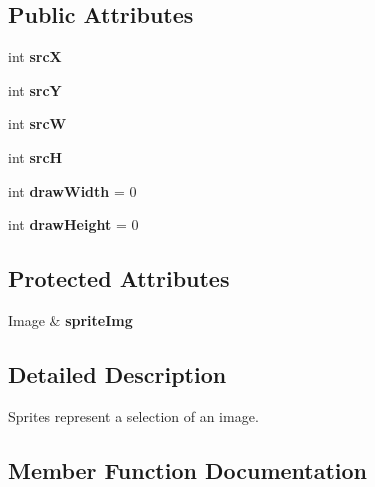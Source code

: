 \subsection*{Public Attributes}
\begin{DoxyCompactItemize}
\item 
\mbox{\label{classcturtle_1_1Sprite_a14ee0caf7711b2bf11095ddaac069c74}} 
int {\bfseries srcX}
\item 
\mbox{\label{classcturtle_1_1Sprite_adc6670708305b93417b816d5461ff8f6}} 
int {\bfseries srcY}
\item 
\mbox{\label{classcturtle_1_1Sprite_a07c26c8940ff747d59932da16046b8df}} 
int {\bfseries srcW}
\item 
\mbox{\label{classcturtle_1_1Sprite_ac971ad3971d5a17c480e211c4393e85d}} 
int {\bfseries srcH}
\item 
\mbox{\label{classcturtle_1_1Sprite_ae913b2e7e5a63b5aa435b34d21178ef8}} 
int {\bfseries draw\+Width} = 0
\item 
\mbox{\label{classcturtle_1_1Sprite_a5138e4802c2d4cc73f43100de2cba412}} 
int {\bfseries draw\+Height} = 0
\end{DoxyCompactItemize}
\subsection*{Protected Attributes}
\begin{DoxyCompactItemize}
\item 
\mbox{\label{classcturtle_1_1Sprite_a7aff22fa5844b2cb6c6cf95467df2421}} 
Image \& {\bfseries sprite\+Img}
\end{DoxyCompactItemize}


\subsection{Detailed Description}
Sprites represent a selection of an image. 

\subsection{Member Function Documentation}
\mbox{\label{classcturtle_1_1Sprite_a7b57808acc51a2610b7d33f542a7f838}} 
